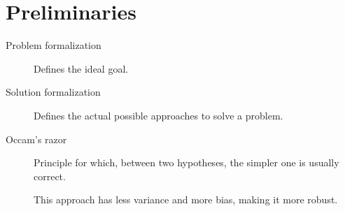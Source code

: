 \chapter{Preliminaries}


\begin{description}
    \item[Problem formalization] 
        Defines the ideal goal.

    \item[Solution formalization] 
        Defines the actual possible approaches to solve a problem.
\end{description}


\begin{description}
    \item[Occam's razor] 
        Principle for which, between two hypotheses, the simpler one is usually correct.

        \begin{remark}
            This approach has less variance and more bias, making it more robust.
        \end{remark}
\end{description}